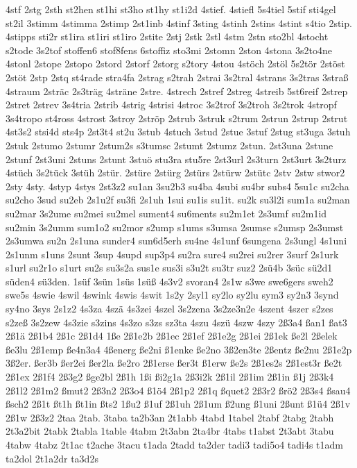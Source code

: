{4stf
2stg
2sth
st2hen
st1hi
st3ho
st1hy
st1i2d
4stief.
4stiefl
5s4tiel
5stif
sti4gel
st2il
3stimm
4stimma
2stimp
2st1inb
4stinf
3sting
4stinh
2stins
4stint
s4tio
2stip.
4stipps
sti2r
st1ira
st1iri
st1iro
2stite
2stj
2stk
2stl
4stm
2stn
sto2bl
4stocht
s2tode
3s2tof
stoffen6
stof8fens
6stoffiz
sto3mi
2stomn
2ston
4stona
3s2to4ne
4stonl
2stope
2stopo
2stord
2storf
2storg
s2tory
4stou
4stöch
2stöl
5s2tör
2stöst
2stöt
2stp
2stq
st4rade
stra4fa
2strag
s2trah
2strai
3s2tral
4strans
3s2tras
3straß
4straum
2sträc
2s3träg
4sträne
2stre.
4strech
2stref
2streg
4streib
5st6reif
2strep
2stret
2strev
3s4tria
2strib
4strig
4strisi
4stroc
3s2trof
3s2troh
3s2trok
4stropf
3s4tropo
st4ross
4strost
3stroy
2ströp
2strub
3struk
s2trum
2strun
2strup
2strut
4st3s2
stsi4d
sts4p
2st3t4
st2u
3stub
4stuch
3stud
2stue
3stuf
2stug
st3uga
3stuh
2stuk
2stumo
2stumr
2stum2s
s3tumsc
2stumt
2stumz
2stun.
2st3una
2stune
2stunf
2st3uni
2stuns
2stunt
3stuö
stu3ra
stu5re
2st3url
2s3turn
2st3urt
3s2turz
4stüch
3s2tück
3stüh
2stür.
2stüre
2stürg
2stürs
2stürw
2stütc
2stv
2stw
stwor2
2sty
4sty.
4styp
4stys
2st3z2
su1an
3su2b3
su4ba
4subi
su4br
subs4
5su1c
su2cha
su2cho
3sud
su2eb
2s1u2f
su3fi
2s1uh
1sui
su1is
su1it.
su2k
su3l2i
sum1a
su2man
su2mar
3s2ume
su2mei
su2mel
sument4
su6ments
su2m1et
2s3umf
su2m1id
su2min
3s2umm
sum1o2
su2mor
s2ump
s1ums
s3umsa
2sumse
s2umsp
2s3umst
2s3umwa
su2n
2s1una
sunder4
sun6d5erh
su4ne
4s1unf
6sungena
2s3ungl
4s1uni
2s1unm
s1uns
2sunt
3sup
4supd
sup3p4
su2ra
sure4
su2rei
su2rer
3surf
2s1urk
s1url
su2r1o
s1urt
su2s
su3s2a
sus1e
sus3i
s3u2t
su3tr
suz2
2sü4b
3süc
sü2d1
süden4
sü3den.
1süf
3sün
1süs
1süß
4s3v2
svoran4
2s1w
s3we
swe6gers
sweh2
swe5s
4swie
4swil
4swink
4swis
4swit
1s2y
2syl1
sy2lo
sy2lu
sym3
sy2n3
3synd
sy4no
3sys
2s1z2
4s3za
4szä
4s3zei
4szel
3s2zena
3s2ze3n2e
4szent
4szer
s2zes
s2zeß
3s2zew
4s3zie
s3zins
4s3zo
s3zs
sz3ta
4szu
4szü
4szw
4szy
2ß3a4
ßan1
ßat3
2ß1ä
2ß1b4
2ß1c
2ß1d4
1ße
2ß1e2b
2ß1ec
2ß1ef
2ß1e2g
2ß1ei
2ß1ek
ße2l
2ßelek
ße3lu
2ß1emp
ße4n3a4
4ßenerg
ße2ni
ß1enke
ße2no
3ß2en3te
2ßentz
ße2nu
2ß1e2p
3ß2er.
ßer3b
ßer2ei
ßer2la
ße2ro
2ß1erse
ßer3t
ß1erw
ße2s
2ß1es2s
2ß1est3r
ße2t
2ß1ex
2ß1f4
2ß3g2
ßge2bl
2ß1h
1ßi
ßi2g1a
2ß3i2k
2ß1il
2ß1im
2ß1in
ß1j
2ß3k4
2ß1l2
2ß1m2
ßmut2
2ß3n2
2ß3o4
ß1ö4
2ß1p2
2ß1q
ßquet2
2ß3r2
ßrö2
2ß3s4
ßsau4
ßsch2
2ß1t
ßt1h
ßt1in
ßts2
1ßu2
ß1uf
2ß1uh
2ß1um
ß2ung
ß1uni
2ßunt
ß1ü4
2ß1v
2ß1w
2ß3z2
2taa
2tab.
3taba
ta2b3an
2t1abb
4tabd
1tabel
2tabf
2tabg
2tabh
2t3a2bit
2tabk
2tabla
1table
4tabm
2t3abn
2ta4br
4tabs
t1abst
2t3abt
3tabu
4tabw
4tabz
2t1ac
t2ache
3tacu
t1ada
2tadd
ta2der
tadi3
tadi5o4
tadi4s
t1adm
ta2dol
2t1a2dr
ta3d2s
}
